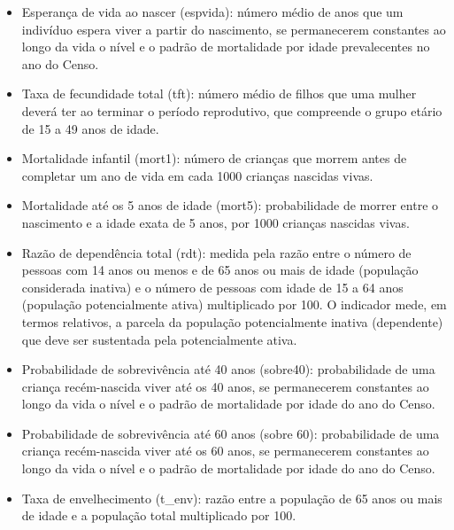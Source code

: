 \documentclass[10pt,twoside]{article}
\begin{document}
\begin{itemize}
    \item {Esperança de vida ao nascer (espvida): número médio de anos que um indivíduo espera viver a partir do nascimento, se permanecerem constantes ao longo da vida o nível e o padrão de mortalidade por idade prevalecentes no ano do Censo.}

    \item {Taxa de fecundidade total (tft): número médio de filhos que uma mulher deverá ter ao terminar o período reprodutivo, que compreende o grupo etário de 15 a 49 anos de idade.}

    \item {Mortalidade infantil (mort1): número de crianças que morrem antes de completar um ano de vida em cada 1000 crianças nascidas vivas.}

    \item {Mortalidade até os 5 anos de idade (mort5): probabilidade de morrer entre o nascimento e a idade exata de 5 anos, por 1000 crianças nascidas vivas.} 

    \item{Razão de dependência total (rdt): medida pela razão entre o número de pessoas com 14 anos ou menos e de 65 anos ou mais de idade (população considerada inativa) e o número de pessoas com idade de 15 a 64 anos (população potencialmente ativa) multiplicado por 100. O indicador mede, em termos relativos, a parcela da população potencialmente inativa (dependente) que deve ser sustentada pela potencialmente ativa.}

    \item {Probabilidade de sobrevivência até 40 anos (sobre40): probabilidade de uma criança recém-nascida viver até os 40 anos, se permanecerem constantes ao longo da vida o nível e o padrão de mortalidade por idade do ano do Censo.}

    \item {Probabilidade de sobrevivência até 60 anos (sobre 60): probabilidade de uma criança recém-nascida viver até os 60 anos, se permanecerem constantes ao longo da vida o nível e o padrão de mortalidade por idade do ano do Censo.}

    \item {Taxa de envelhecimento (t\_env): razão entre a população de 65 anos ou mais de idade e a população total multiplicado por 100.}

\end{itemize}
\end{document}
